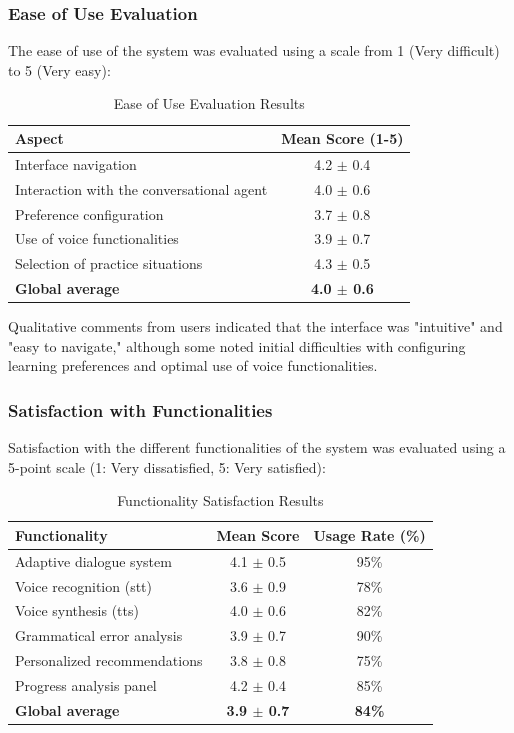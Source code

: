 \subsubsection{Ease of Use Evaluation}
\label{subsubsec:facilidad_uso}

The ease of use of the system was evaluated using a scale from 1 (Very difficult) to 5 (Very easy):

\begin{table}[h]
\centering
\caption{Ease of Use Evaluation Results}
\label{table:facilidad_uso}
\begin{tabular}{|l|c|}
\hline
\textbf{Aspect} & \textbf{Mean Score (1-5)} \\
\hline
Interface navigation & 4.2 $\pm$ 0.4 \\
\hline
Interaction with the conversational agent & 4.0 $\pm$ 0.6 \\
\hline
Preference configuration & 3.7 $\pm$ 0.8 \\
\hline
Use of voice functionalities & 3.9 $\pm$ 0.7 \\
\hline
Selection of practice situations & 4.3 $\pm$ 0.5 \\
\hline
\textbf{Global average} & \textbf{4.0 $\pm$ 0.6} \\
\hline
\end{tabular}
\end{table}

Qualitative comments from users indicated that the interface was "intuitive" and "easy to navigate," although some noted initial difficulties with configuring learning preferences and optimal use of voice functionalities.

\subsubsection{Satisfaction with Functionalities}
\label{subsubsec:satisfaccion_funcionalidades}

Satisfaction with the different functionalities of the system was evaluated using a 5-point scale (1: Very dissatisfied, 5: Very satisfied):

\begin{table}[h]
\centering
\caption{Functionality Satisfaction Results}
\label{table:satisfaccion_funcionalidades}
\begin{tabular}{|l|c|c|}
\hline
\textbf{Functionality} & \textbf{Mean Score} & \textbf{Usage Rate (\%)} \\
\hline
Adaptive dialogue system & 4.1 $\pm$ 0.5 & 95\% \\
\hline
Voice recognition (\gls{stt}) & 3.6 $\pm$ 0.9 & 78\% \\
\hline
Voice synthesis (\gls{tts}) & 4.0 $\pm$ 0.6 & 82\% \\
\hline
Grammatical error analysis & 3.9 $\pm$ 0.7 & 90\% \\
\hline
Personalized recommendations & 3.8 $\pm$ 0.8 & 75\% \\
\hline
Progress analysis panel & 4.2 $\pm$ 0.4 & 85\% \\
\hline
\textbf{Global average} & \textbf{3.9 $\pm$ 0.7} & \textbf{84\%} \\
\hline
\end{tabular}
\end{table}


